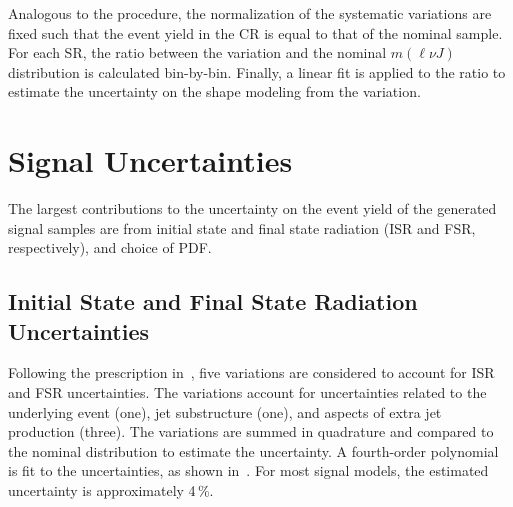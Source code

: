 Analogous to the \Wjets procedure, the normalization of the systematic variations are fixed such that the event yield in the \ttbar CR is equal to that of the nominal sample. For each SR, the ratio between the variation and the nominal $m(\ell\nu J)$ distribution is calculated bin-by-bin. Finally, a linear fit is applied to the ratio to estimate the uncertainty on the shape modeling from the variation. 


\section{Signal Uncertainties}
\label{ch:syst:sig_unc}
The largest contributions to the uncertainty on the event yield of the generated signal samples are from initial state and final state radiation (ISR and FSR, respectively), and choice of PDF. 

%
\subsection{Initial State and Final State Radiation Uncertainties}
Following the prescription in~, five variations are considered to account for ISR and FSR uncertainties. The variations account for uncertainties related to the underlying event (one), jet substructure (one), and aspects of extra jet production (three). The variations are summed in quadrature and compared to the nominal distribution to estimate the uncertainty. A fourth-order polynomial is fit to the uncertainties, as shown in~\Fig{\ref{fig:isrfsr}}. For most signal models, the estimated uncertainty is approximately 4\,\%.

%
